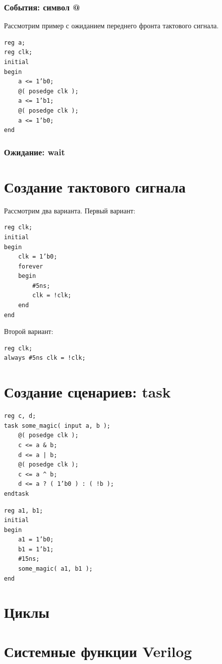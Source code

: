 \documentclass[a4paper,oneside ,10pt]{extreport}
\begin{document}
\subsubsection{События: символ @}

Рассмотрим пример с ожиданием переднего фронта тактового сигнала.

\begin{Verbatim}[tabsize=4]
reg a;
reg clk;
initial
begin
	a <= 1’b0;
	@( posedge clk );
	a <= 1’b1;	
	@( posedge clk );
	a <= 1’b0;
end
\end{Verbatim}

\subsubsection{Ожидание: wait}

\section{Создание тактового сигнала}
Рассмотрим два варианта. Первый вариант:
\begin{Verbatim}[tabsize=4]
reg clk;
initial
begin
	clk = 1’b0;
	forever
	begin
		#5ns;
		clk = !clk; 
	end
end
\end{Verbatim}
Второй вариант:
\begin{Verbatim}[tabsize=4]
reg clk;
always #5ns clk = !clk;
\end{Verbatim}

\section{Создание сценариев: task}

\begin{Verbatim}[tabsize=4]
reg c, d;
task some_magic( input a, b );
	@( posedge clk );
	c <= a & b;
	d <= a | b;
	@( posedge clk );
	c <= a ^ b;
	d <= a ? ( 1’b0 ) : ( !b );
endtask
\end{Verbatim}

\begin{Verbatim}[tabsize=4]
reg a1, b1; 
initial
begin
	a1 = 1’b0;
	b1 = 1’b1;
	#15ns;
	some_magic( a1, b1 );
end

\end{Verbatim}

\section{Циклы}

\section{Системные функции Verilog}
\end{document}
